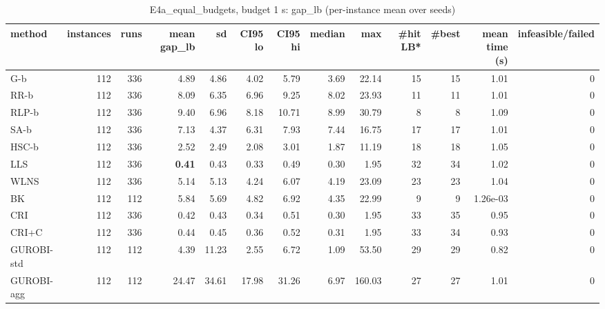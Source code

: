 \begin{table}[htbp]
\centering
\small
\caption{E4a\_equal\_budgets, budget 1 s: gap\_lb (per-instance mean over seeds)}
\label{tab:E4a_equal_budgets_b1_summary}
\begin{tabular}{lrrrrrrrrrrrr}
\toprule
method & instances & runs & mean gap\_lb & sd & CI95 lo & CI95 hi & median & max & \#hit LB* & \#best & mean time (s) & infeasible/failed \\
\midrule
G-b & 112 & 336 & 4.89 & 4.86 & 4.02 & 5.79 & 3.69 & 22.14 & 15 & 15 & 1.01 & 0 \\
RR-b & 112 & 336 & 8.09 & 6.35 & 6.96 & 9.25 & 8.02 & 23.93 & 11 & 11 & 1.01 & 0 \\
RLP-b & 112 & 336 & 9.40 & 6.96 & 8.18 & 10.71 & 8.99 & 30.79 & 8 & 8 & 1.09 & 0 \\
SA-b & 112 & 336 & 7.13 & 4.37 & 6.31 & 7.93 & 7.44 & 16.75 & 17 & 17 & 1.01 & 0 \\
HSC-b & 112 & 336 & 2.52 & 2.49 & 2.08 & 3.01 & 1.87 & 11.19 & 18 & 18 & 1.05 & 0 \\
LLS & 112 & 336 & \textbf{0.41} & 0.43 & 0.33 & 0.49 & 0.30 & 1.95 & 32 & 34 & 1.02 & 0 \\
WLNS & 112 & 336 & 5.14 & 5.13 & 4.24 & 6.07 & 4.19 & 23.09 & 23 & 23 & 1.04 & 0 \\
BK & 112 & 112 & 5.84 & 5.69 & 4.82 & 6.92 & 4.35 & 22.99 & 9 & 9 & 1.26e-03 & 0 \\
CRI & 112 & 336 & 0.42 & 0.43 & 0.34 & 0.51 & 0.30 & 1.95 & 33 & 35 & 0.95 & 0 \\
CRI+C & 112 & 336 & 0.44 & 0.45 & 0.36 & 0.52 & 0.31 & 1.95 & 33 & 34 & 0.93 & 0 \\
GUROBI-std & 112 & 112 & 4.39 & 11.23 & 2.55 & 6.72 & 1.09 & 53.50 & 29 & 29 & 0.82 & 0 \\
GUROBI-agg & 112 & 112 & 24.47 & 34.61 & 17.98 & 31.26 & 6.97 & 160.03 & 27 & 27 & 1.01 & 0 \\
\bottomrule
\end{tabular}
\end{table}
